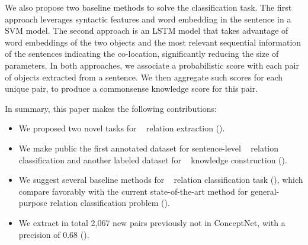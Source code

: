 
We also propose two baseline methods to solve the classification task.
The first approach leverages syntactic features and word embedding
in the sentence in a SVM model. The second approach is an LSTM
model that takes advantage of word embeddings of the 
two objects and the most relevant sequential information of the sentences 
indicating the co-location, significantly reducing the size of 
parameters. In both approaches,
we associate a probabilistic score with each pair of objects extracted
from a sentence. We then aggregate such scores for each unique pair,
to produce a commonsense knowledge score for this pair.  

In summary, this paper makes the following contributions:

\begin{itemize}
	\item We proposed two novel tasks for \lnear~ relation extraction
	().
	
	\item We make public the first annotated dataset for 
	sentence-level \lnear~ relation classification and another labeled dataset for
	\lnear~ knowledge construction (). 
	
	\item We suggest several baseline methods for \lnear~ relation 
	classification task (), 
	which compare favorably with the current state-of-the-art
	method for general-purpose relation classification problem (). 
	
	\item We extract in total 2,067 new pairs previously not in
	ConceptNet, with a precision of 0.68 ().
\end{itemize}


